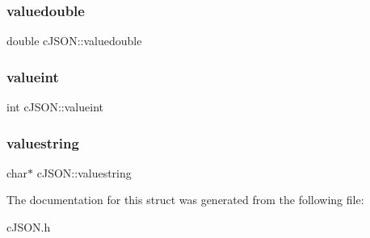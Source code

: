 \subsubsection{\texorpdfstring{valuedouble}{valuedouble}}
{\footnotesize\ttfamily double c\+J\+S\+O\+N\+::valuedouble}

\mbox{\label{structc_j_s_o_n_a369cea49494eb5d4409d532a731a0fbf}} 
\subsubsection{\texorpdfstring{valueint}{valueint}}
{\footnotesize\ttfamily int c\+J\+S\+O\+N\+::valueint}

\mbox{\label{structc_j_s_o_n_ad43f8de2571e504c4c5ce0a36990e6e1}} 
\subsubsection{\texorpdfstring{valuestring}{valuestring}}
{\footnotesize\ttfamily char$\ast$ c\+J\+S\+O\+N\+::valuestring}



The documentation for this struct was generated from the following file\+:\begin{DoxyCompactItemize}
\item 
c\+J\+S\+O\+N.\+h\end{DoxyCompactItemize}
